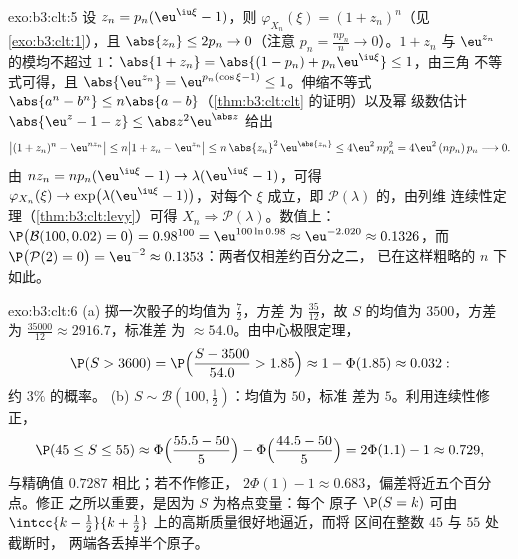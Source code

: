 \begin{solution}{exo:b3:clt:5}
设 $z_n = p_n(\eu^{\iu\xi} - 1)$，则 $\varphi_{X_n}(\xi) =
(1 + z_n)^n$（见\cref{exo:b3:clt:1}），且 $\abs{z_n} \leq 2p_n
\to 0$（注意 $p_n = \frac{np_n}n \to 0$）。$1 + z_n$ 与
$\eu^{z_n}$ 的模均不超过 $1$：$\abs{1 + z_n} =
\abs{(1 - p_n) + p_n\eu^{\iu\xi}} \leq 1$，由三角
不等式可得，且 $\abs{\eu^{z_n}} = \eu^{p_n(\cos\xi - 1)}
\leq 1$。伸缩不等式 $\abs{a^n - b^n} \leq
n\abs{a - b}$（\cref{thm:b3:clt:clt} 的证明）以及幂
级数估计 $\abs{\eu^z - 1 - z} \leq
\abs z^2\eu^{\abs z}$ 给出
\[
\bigl|(1 + z_n)^n - \eu^{nz_n}\bigr| \leq n\bigl|1 + z_n -
\eu^{z_n}\bigr| \leq n\,\abs{z_n}^2\,\eu^{\abs{z_n}} \leq
4\eu^2\,np_n^2 = 4\eu^2\,(np_n)\,p_n \longrightarrow 0 .
\]
由 $nz_n = np_n(\eu^{\iu\xi} - 1) \to
\lambda(\eu^{\iu\xi} - 1)$，可得 $\varphi_{X_n}(\xi)
\to \exp\bigl(\lambda(\eu^{\iu\xi} - 1)\bigr)$，对每个
$\xi$ 成立，即 $\mathcal P(\lambda)$ 的，由列维
连续性定理（\cref{thm:b3:clt:levy}）可得 $X_n \Rightarrow \mathcal
P(\lambda)$。数值上：$\P\bigl(\mathcal B(100, 0.02) =
0\bigr) = 0.98^{100} = \eu^{100\ln 0.98} \approx
\eu^{-2.020} \approx 0.1326$，而 $\P\bigl(\mathcal P(2) =
0\bigr) = \eu^{-2} \approx 0.1353$：两者仅相差约百分之二，
已在这样粗略的 $n$ 下如此。
\end{solution}

\begin{solution}{exo:b3:clt:6}
(a) 掷一次骰子的均值为 $\frac72$，方差
为 $\frac{35}{12}$，故 $S$ 的均值为 $3500$，方差
为 $\frac{35000}{12} \approx 2916.7$，标准差
为 $\approx 54.0$。由中心极限定理，
\[
\P(S > 3600) = \P\Bigl(\frac{S - 3500}{54.0} > 1.85\Bigr)
\approx 1 - \Phi(1.85) \approx 0.032 :
\]
约 $3\%$ 的概率。
(b) $S \sim \mathcal B(100, \frac12)$：均值为 $50$，标准
差为 $5$。利用连续性修正，
\[
\P(45 \leq S \leq 55) \approx
\Phi\Bigl(\frac{55.5 - 50}{5}\Bigr) -
\Phi\Bigl(\frac{44.5 - 50}{5}\Bigr) = 2\Phi(1.1) - 1
\approx 0.729,
\]
与精确值 $0.7287$ 相比；若不作修正，
$2\Phi(1) - 1 \approx 0.683$，偏差将近五个百分点。修正
之所以重要，是因为 $S$ 为格点变量：每个
原子 $\P(S = k)$ 可由
$\intcc{k - \frac12}{k + \frac12}$ 上的高斯质量很好地逼近，而将
区间在整数 $45$ 与 $55$ 处截断时，
两端各丢掉半个原子。
\end{solution}

